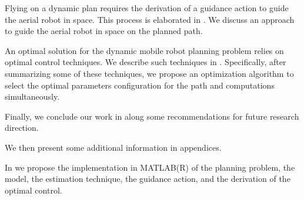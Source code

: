 Flying on a dynamic plan requires the derivation of a guidance action to guide the aerial robot in space. This process is elaborated in . We discuss an approach to guide the aerial robot in space on the planned path.

An optimal solution for the dynamic mobile robot planning problem relies on optimal control techniques. We describe such techniques in . Specifically, after summarizing some of these techniques, we propose an optimization algorithm to select the optimal parameters configuration for the path and computations simultaneously.

Finally, we conclude our work in  along some recommendations for future research direction.

We then present some additional information in appendices.

In  we propose the implementation in MATLAB(R) of the planning problem, the model, the estimation technique, the guidance action, and the derivation of the optimal control. 

